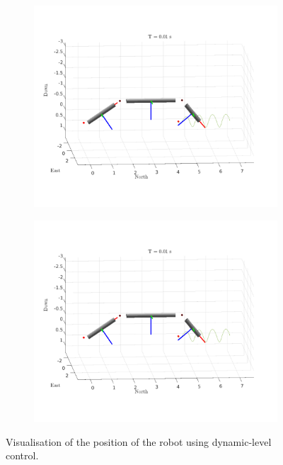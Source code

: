 \begin{figure}[h!]
\begin{subfigure}[b]{0.45\linewidth}
        \includegraphics[page=5,width=\linewidth]{assets/results/dynamic/gif.pdf}
    \end{subfigure}
    \begin{subfigure}[b]{0.45\linewidth}
        \includegraphics[page=6,width=\linewidth]{assets/results/dynamic/gif.pdf}
    \end{subfigure}
    \caption{Visualisation of the position of the robot using dynamic-level control.}
    \label{fig:dynamic_vis}
\end{figure}

